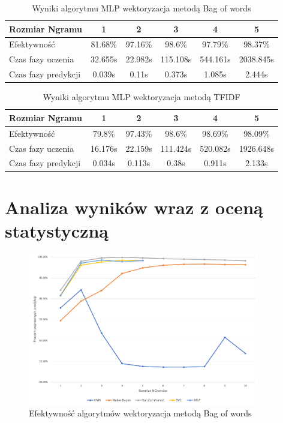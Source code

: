 \begin{table}[H]
    \centering
    \caption{Wyniki algorytmu MLP wektoryzacja metodą Bag of words}
    \begin{tabular}{ | l | c | c | c | c | c |}
        \hline
        Rozmiar Ngramu & 1 & 2 & 3 & 4 & 5  \\ \hline
        Efektywność & 81.68\% & 97.16\% & 98.6\% & 97.79\% & 98.37\%   \\ \hline
        Czas fazy uczenia & 32.655s & 22.982s & 115.108s & 544.161s & 2038.845s  \\ \hline
        Czas fazy predykcji & 0.039s & 0.11s & 0.373s & 1.085s & 2.444s  \\ \hline
    \end{tabular}
\end{table}

\begin{table}[H]
    \centering
    \caption{Wyniki algorytmu MLP wektoryzacja metodą TFIDF}
    \begin{tabular}{ | l | c | c | c | c | c |}
        \hline
        Rozmiar Ngramu & 1 & 2 & 3 & 4 & 5   \\ \hline
        Efektywność & 79.8\% & 97.43\% & 98.6\% & 98.69\% & 98.09\%   \\ \hline
        Czas fazy uczenia & 16.176s & 22.159s & 111.424s & 520.082s & 1926.648s  \\ \hline
        Czas fazy predykcji & 0.034s & 0.113s & 0.38s & 0.911s & 2.133s  \\ \hline
    \end{tabular}
\end{table}
\section{Analiza wyników wraz z oceną statystyczną}

\begin{figure}[h!]
    \centering
    \includegraphics[width=0.9\textwidth]{./Img/BOWAcc.png}
    \caption{Efektywność algorytmów wektoryzacja metodą Bag of words}
\end{figure}

